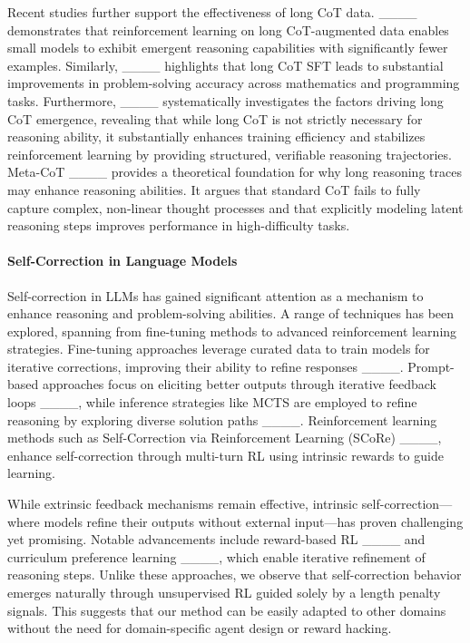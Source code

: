 Recent studies further support the effectiveness of long CoT data. ____ demonstrates that reinforcement learning on long CoT-augmented data enables small models to exhibit emergent reasoning capabilities with significantly fewer examples. Similarly, ____ highlights that long CoT SFT leads to substantial improvements in problem-solving accuracy across mathematics and programming tasks. Furthermore, ____ systematically investigates the factors driving long CoT emergence, revealing that while long CoT is not strictly necessary for reasoning ability, it substantially enhances training efficiency and stabilizes reinforcement learning by providing structured, verifiable reasoning trajectories. 
Meta-CoT ____ provides a theoretical foundation for why long reasoning traces may enhance reasoning abilities. It argues that standard CoT fails to fully capture complex, non-linear thought processes and that explicitly modeling latent reasoning steps improves performance in high-difficulty tasks.



\paragraph{Self-Correction in Language Models}

Self-correction in LLMs has gained significant attention as a mechanism to enhance reasoning and problem-solving abilities. A range of techniques has been explored, spanning from fine-tuning methods to advanced reinforcement learning strategies. 
Fine-tuning approaches leverage curated data to train models for iterative corrections, improving their ability to refine responses ____. 
Prompt-based approaches focus on eliciting better outputs through iterative feedback loops ____, while inference strategies like MCTS are employed to refine reasoning by exploring diverse solution paths ____. 
Reinforcement learning methods such as Self-Correction via Reinforcement Learning (SCoRe) ____, enhance self-correction through multi-turn RL using intrinsic rewards to guide learning.

While extrinsic feedback mechanisms remain effective, intrinsic self-correction—where models refine their outputs without external input—has proven challenging yet promising. Notable advancements include reward-based RL ____ and curriculum preference learning ____, which enable iterative refinement of reasoning steps. 
Unlike these approaches, we observe that self-correction behavior emerges naturally through unsupervised RL guided solely by a length penalty signals. This suggests that our method can be easily adapted to other domains without the need for domain-specific agent design or reward hacking.


